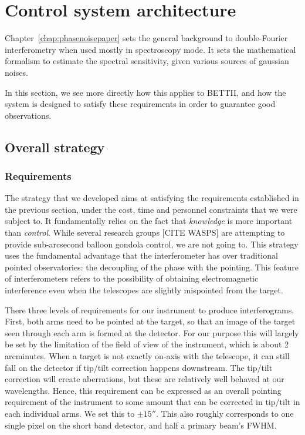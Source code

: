 \section{Control system architecture}
\label{sec:Chap3-ControlSystemArchitecture}
Chapter~\ref{chap:phasenoisepaper} sets the general background to double-Fourier interferometry when used mostly in spectroscopy mode. It sets the mathematical formalism to estimate the spectral sensitivity, given various sources of gaussian noises. 

In this section, we see more directly how this applies to BETTII, and how the system is designed to satisfy these requirements in order to guarantee good observations.

\subsection{Overall strategy}

\subsubsection{Requirements}
The strategy that we developed aims at satisfying the requirements established in the previous section, under the cost, time and personnel constraints that we were subject to. It fundamentally relies on the fact that \textit{knowledge} is more important than \textit{control}. While several research groups [CITE WASPS] are attempting to provide sub-arcsecond balloon gondola control, we are not going to. This strategy uses the fundamental advantage that the interferometer has over traditional pointed observatories: the decoupling of the phase with the pointing. This feature of interferometers refers to the possibility of obtaining electromagnetic interference even when the telescopes are slightly mispointed from the target. 

There three levels of requirements for our instrument to produce interferograms. First, both arms need to be pointed at the target, so that an image of the target seen through each arm is formed at the detector. For our purpose this will largely be set by the limitation of the field of view of the instrument, which is about 2 arcminutes. When a target is not exactly on-axis with the telescope, it can still fall on the detector if tip/tilt correction happens downstream. The tip/tilt correction will create aberrations, but these are relatively well behaved at our wavelengths. Hence, this requirement can be expressed as an overall pointing requirement of the instrument to some amount that can be corrected in tip/tilt in each individual arms. We set this to $\pm\ang{;;15}$. This also roughly corresponds to one single pixel on the short band detector, and half a primary beam's FWHM.

